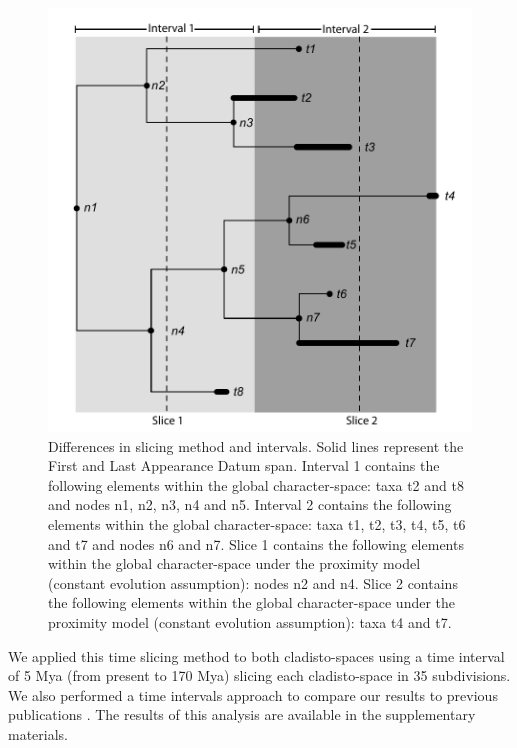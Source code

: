 \documentclass[12pt,letterpaper]{article}
\begin{document}
\begin{figure}[!htbp]
\centering
    \includegraphics[keepaspectratio=true]{Figures/Slicing.pdf}
\caption{Differences in slicing method and intervals. Solid lines represent the First and Last Appearance Datum span. Interval 1 contains the following elements within the global character-space: taxa t2 and t8 and nodes n1, n2, n3, n4 and n5. Interval 2 contains the following elements within the global character-space: taxa t1, t2, t3, t4, t5, t6 and t7 and nodes n6 and n7. Slice 1 contains the following elements within the global character-space under the proximity model (constant evolution assumption): nodes n2 and n4. Slice 2 contains the following elements within the global character-space under the proximity model (constant evolution assumption): taxa t4 and t7.}
\label{fig_slicing}
\end{figure}

We applied this time slicing method to both cladisto-spaces \citep{MEE3:MEE312084,beckancient2014} using a time interval of 5 Mya (from present to 170 Mya) slicing each cladisto-space in 35 subdivisions. We also performed a time intervals approach to compare our results to previous publications \citep[e.g.][]{Brusatte12092008,brusattedinosaur2012,toljagictriassic-jurassic2013}. The results of this analysis are available in the supplementary materials.
\end{document}
